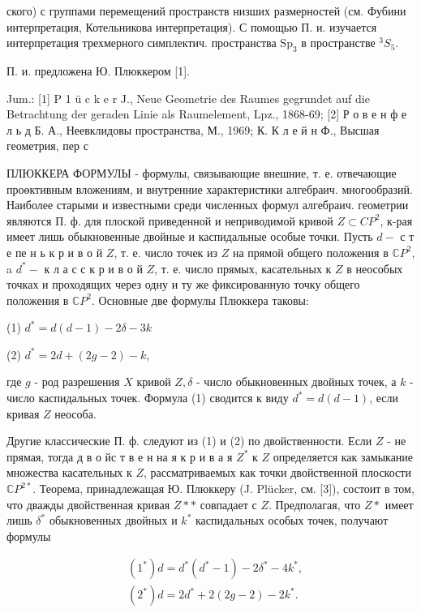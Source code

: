 \documentclass[10pt]{article}
\begin{document}
ского) с группами перемещений пространств низших размерностей (см. Фубини интерпретация, Котельникова интерпретация). С помощью П. и. изучается интерпретация трехмерного симплектич. пространства $\mathrm{Sp}_{3}$ в пространстве ${ }^{3} S_{5}$.



П. и. предложена Ю. Плюккером [1].



Jum.: [1] P 1 ü c k e r J., Neue Geometrie des Raumes gegrundet auf die Betrachtung der geraden Linie als Raumelement, Lpz., 1868-69; [2] Р о в е н ф е л ь д Б. А., Неевклидовы пространства, М., 1969; К. К л е й н Ф., Высшая геометрия, пер с



ПЛЮККЕРА ФОРМУЛЫ - формулы, связывающие внешние, т. е. отвечающие проөктивным вложениям, и внутренние характеристики алгебраич. многообразий. Наиболее старыми и известными среди численных формул алгебраич. геометрии являются П. ф. для плоской приведенной и неприводимой кривой $Z \subset C P^{2}$, к-рая имеет лишь обыкновенные двойные и каспидальные особые точки. Пусть $d-$ с т е пе н ь к р и в о й $Z$, т. е. число точек из $Z$ на прямой общего положения в $\mathbb{C} P^{2}$, a $d^{*}-$ к л а с с к р и в о й $Z$, т. е. число прямых, касательных к $Z$ в неособых точках и проходящих через одну и ту же фиксированную точку общего положения в $\mathbb{C} P^{2}$. Основные две формулы Плюккера таковы:

(1) $d^{*}=d(d-1)-2 \delta-3 k$

(2) $d^{*}=2 d+(2 g-2)-k$,



где $g$ - род разрешения $X$ кривой $Z, \delta$ - число обыкновенных двойных точек, а $k$ - число каспидальных точек. Формула (1) сводится к виду $d^{*}=d(d-1)$, если кривая $Z$ неособа.



Другие классические П. ф. следуют из (1) и (2) по двойственности. Если $Z$ - не прямая, тогда д в о йс т в е н на я к р и в а я $Z^{*}$ к $Z$ определяется как замыкание множества касательных к $Z$, рассматриваемых как точки двойственной плоскости $\mathbb{C} P^{2 *}$. Теорема, принадлежащая Ю. Плюккеру (J. Plücker, см. [3]), состоит в том, что дважды двойственная кривая $Z * *$ совпадает с $Z$. Предполагая, что $Z *$ имеет лишь $\delta^{*}$ обыкновенных двойных и $k^{*}$ каспидальных особых точек, получают формулы



\[

\begin{aligned}

& \left(1^{*}\right) d=d^{*}\left(d^{*}-1\right)-2 \delta^{*}-4 k^{*}, \\

& \left(2^{*}\right) d=2 d^{*}+2(2 g-2)-2 k^{*} .

\end{aligned}

\]
\end{document}
